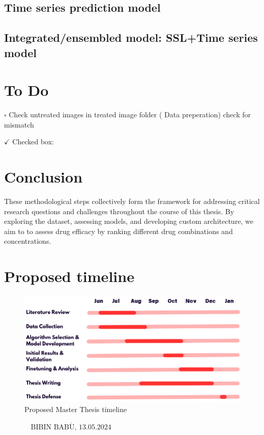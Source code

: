 \documentclass[12pt,twoside,a4paper,parskip]{scrbook} %
\def\BaAuthor{Bibin Babu}
\def\SubmitDate{13.05.2024}
\def\ShowBaAuthor{\BaAuthor}
\def\ShowBaAuthor{BIBIN BABU}
\begin{document}
\section{Time series prediction model}
\section{Integrated/ensembled model: SSL+Time series model}

\chapter{To Do}\label{ch:To Do}
$\square$ Check untreated images in treated image folder ( Data preperation) check for mismatch 

$\checkmark$ Checked box: 
\chapter{Conclusion}\label{ch:Conclusion}

These methodological steps collectively form the framework for addressing critical research questions and challenges throughout the course of this thesis. By exploring the dataset, assessing models, and developing custom architecture, we aim to to assess drug efficacy by ranking different drug combinations and concentrations.

\let\cleardoublepage\clearpage

\chapter{Proposed timeline}\label{ch:Proposed timeline}

\begin{figure}[H]
    \centering
    \includegraphics[width=0.9\linewidth]{figures/Thesis timeline.png} %
    \caption{Proposed Master Thesis timeline}
    \label{fig:enter-label}
\end{figure}

\FloatBarrier

\printbibliography

\vspace{20pt}
\begin{flushright}
$\overline{~~~~~~~~~~~~~~~~~\mbox{\ShowBaAuthor, \SubmitDate}~~~~~~~~~~~~~~~~~}$
\end{flushright}
\end{document}
